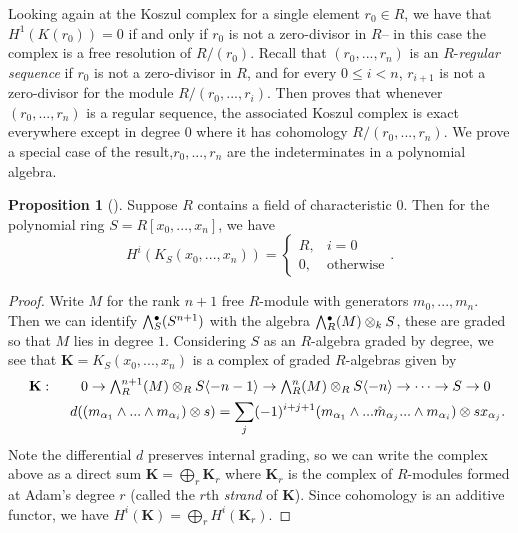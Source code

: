 \documentclass[a4paper]{article}
\theoremstyle{definition}
\newtheorem{prop}[defn]{Proposition}
\theoremstyle{remark}
\newcommand{\Exter}{\mathchoice{{\textstyle\bigwedge}}%
    {{\bigwedge}}%
    {{\textstyle\wedge}}%
    {{\scriptstyle\wedge}}}
\begin{document}
Looking again at the Koszul complex for a single element \(r_0\in R\),
we have that \(H^1(K(r_0))=0\) if and only if \(r_0\) is not a
zero-divisor in \(R\)-- in this case the complex is a free resolution of
\(R/(r_0)\).  Recall that \((r_0,...,r_n)\) is an \(R\)-\textit{regular
sequence} if \(r_0\) is not a zero-divisor in \(R\), and for every \(0\leq i <
n\), \(r_{i+1}\) is not a zero-divisor for the module \(R/(r_0,...,r_i)\). Then
 proves that whenever \((r_0,...,r_n)\) is
a regular sequence, the associated Koszul complex is exact everywhere except in
degree \(0\) where it has cohomology \(R/(r_0,...,r_n)\). We prove a special
case of the result,\(r_0,...,r_n\) are the indeterminates in a polynomial algebra.

\begin{prop}[]\label{prop-koszulcomplex-exactness}
    Suppose \(R\) contains a field of characteristic \(0\). Then
    for the polynomial ring \(S=R[x_0,...,x_n]\), we have 
    \[H^i(K_S(x_0,...,x_n)) = \begin{cases}
        R, &i=0\\
        0, &\text{otherwise}
    \end{cases}.\]

    \begin{proof} 
        Write \(M\) for the rank \(n+1\) free \(R\)-module with generators
        \(m_0,...,m_n\). Then we can identify \(\Exter_S^\bullet(S^{n+1})\) with
        the algebra \(\Exter^\bullet_R(M)\otimes_k S\), these are graded so that
        \(M\) lies in degree \(1\). Considering \(S\) as an \(R\)-algebra graded
        by degree, we see that \(\mathbf{K}=K_S(x_0,...,x_n)\) is a complex of
        graded \(R\)-algebras given by 
        \begin{gather*} \label{k-koszul-strand}
            \mathbf{K}:\qquad 0\rightarrow \Exter^{n+1}_R(M)\otimes_R
            S\langle{-n-1}\rangle \rightarrow \Exter^n_R(M)\otimes_R
            S\langle{-n}\rangle \rightarrow \cdots \rightarrow S \rightarrow 0
            \\ 
            \qquad \qquad d ((m_{\alpha_1}\wedge...\wedge m_{\alpha_i})\otimes
            s) = \sum_j
            (-1)^{i+j+1}(m_{\alpha_1}\wedge...\hat{m}_{\alpha_j}...\wedge
            m_{\alpha_i}) \otimes sx_{\alpha_j}.
        \end{gather*} 
        Note the differential \(d\) preserves internal grading, so we can write the
        complex above as a direct sum \(\mathbf{K} = \bigoplus_r \mathbf{K}_r\)
        where \(\mathbf{K}_r\) is the complex of \(R\)-modules formed at
        Adam's degree \(r\) (called the \(r\)th \textit{strand} of
        \(\mathbf{K}\)). Since cohomology is an additive functor, we have
        \(H^i(\mathbf{K})=\bigoplus_r H^i(\mathbf{K}_r)\).


\end{proof}
\end{prop}
\end{document}
